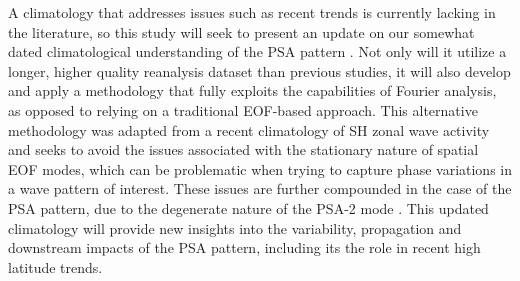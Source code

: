 A climatology that addresses issues such as recent trends is currently lacking in the literature, so this study will seek to present an update on our somewhat dated climatological understanding of the PSA pattern \citep{Mo1998,Mo2001}. Not only will it utilize a longer, higher quality reanalysis dataset than previous studies, it will also develop and apply a methodology that fully exploits the capabilities of Fourier analysis, as opposed to relying on a traditional EOF-based approach. This alternative methodology was adapted from a recent climatology of SH zonal wave activity \citep{IrvingSimmonds2015} and seeks to avoid the issues associated with the stationary nature of spatial EOF modes, which can be problematic when trying to capture phase variations in a wave pattern of interest. These issues are further compounded in the case of the PSA pattern, due to the degenerate \citep{North1982} nature of the PSA-2 mode \citep[e.g. Figure 1;][]{Mo2000}. This updated climatology will provide new insights into the variability, propagation and downstream impacts of the PSA pattern, including its the role in recent high latitude trends. 

